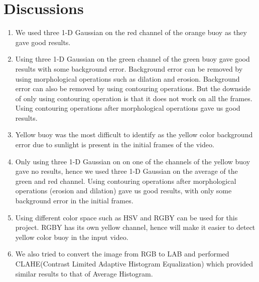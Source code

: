 \documentclass{article}
\begin{document}
\section{Discussions}
\begin{enumerate}
    \item We used three 1-D Gaussian on the red channel of the orange buoy as they gave good results.
    \item Using three 1-D Gaussian on the green channel of the green buoy gave good results with some
background error. Background error can be removed by using morphological operations such as dilation
and erosion. Background error can also be removed by using contouring operations. But the downside of
only using contouring operation is that it does not work on all the frames. Using contouring operations
after morphological operations gave us good results.
    \item Yellow buoy was the most difficult to identify as the yellow color background error due to sunlight is
present in the initial frames of the video.
    \item Only using three 1-D Gaussian on on one of the channels of the yellow buoy gave no results, hence we
used three 1-D Gaussian on the average of the green and red channel. Using contouring operations
after morphological operations (erosion and dilation) gave us good results, with only some background
error in the initial frames.
    \item Using different color space such as HSV and RGBY can be used for this project. RGBY has its
own yellow channel, hence will make it easier to detect yellow color buoy in the input video.
    \item We also tried to convert the image from RGB to LAB and performed CLAHE(Contrast Limited Adaptive Histogram Equalization) which provided similar results to that of Average Histogram.

\end{enumerate}
\end{document}
